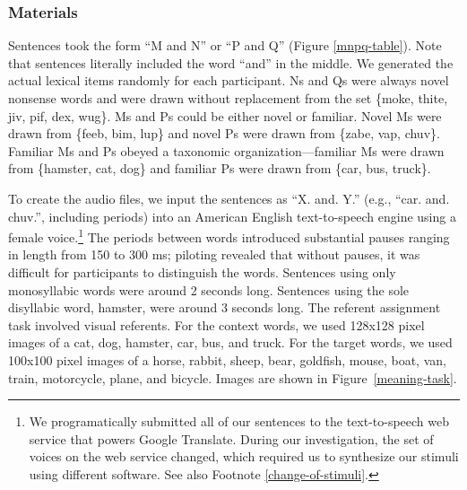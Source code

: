 \documentclass[man,floatsintext]{apa6}
\begin{document}
\subsubsection{Materials}
Sentences took the form ``M and N'' or ``P and Q'' (Figure \ref{mnpq-table}). Note that sentences literally included the word ``and'' in the middle. We generated the actual lexical items randomly for each participant. Ns and Qs were always novel nonsense words and were drawn without replacement from the set \{moke, thite, jiv, pif, dex, wug\}. Ms and Ps could be either novel or familiar. Novel Ms were drawn from \{feeb, bim, lup\} and novel Ps were drawn from \{zabe, vap, chuv\}. Familiar Ms and Ps obeyed a taxonomic organization---familiar Ms were drawn from \{hamster, cat, dog\} and familiar Ps were drawn from \{car, bus, truck\}.

To create the audio files, we input the sentences as ``X. and. Y.'' (e.g., ``car. and. chuv.'', including periods) into an American English text-to-speech engine using a female voice.\footnote{\label{tts} We programatically submitted all of our sentences to the text-to-speech web service that powers Google Translate. During our investigation, the set of voices on the web service changed, which required us to synthesize our stimuli using different software. See also Footnote \ref{change-of-stimuli}.} The periods between words introduced substantial pauses ranging in length from 150 to 300 ms; piloting revealed that without pauses, it was difficult for participants to distinguish the words. Sentences using only monosyllabic words were around 2 seconds long. Sentences using the sole disyllabic word, hamster, were around 3 seconds long.  The referent assignment task involved visual referents. For the context words, we used 128x128 pixel images of a cat, dog, hamster, car, bus, and truck. For the target words, we used 100x100 pixel images of a horse, rabbit, sheep, bear, goldfish, mouse, boat, van, train, motorcycle, plane, and bicycle. Images are shown in Figure~\ref{meaning-task}.
\end{document}
